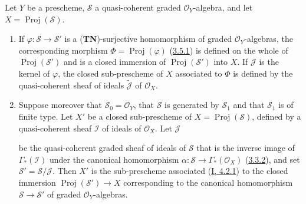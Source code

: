 \begin{proposition}[3.6.2]
\label{II.3.6.2}
Let $Y$ be a prescheme, $\mathcal{S}$ a quasi-coherent graded
$\mathcal{O}_Y$-algebra, and let $X=\operatorname{Proj}(\mathcal{S})$.
\begin{enumerate}
  \item[\rm(i)] If $\varphi:\mathcal{S}\to\mathcal{S}'$ is a
    (\textbf{TN})-surjective homomorphism of graded $\mathcal{O}_Y$-algebras,
    the corresponding morphism
    $\Phi=\operatorname{Proj}(\varphi)$
    (\hyperref[II.3.5.1]{3.5.1}) is defined on the whole of
    $\operatorname{Proj}(\mathcal{S}')$ and is a closed
    immersion of $\operatorname{Proj}(\mathcal{S}')$ into $X$. If $\mathcal{J}$
    is the kernel of $\varphi$, the closed sub-prescheme of $X$ associated to
    $\Phi$ is defined by the quasi-coherent sheaf of ideals
    $\widetilde{\mathcal{J}}$ of $\mathcal{O}_X$.
  \item[\rm(ii)] Suppose moreover that $\mathcal{S}_0=\mathcal{O}_Y$,
    that $\mathcal{S}$ is generated by $\mathcal{S}_1$ and that $\mathcal{S}_1$
    is of finite type. Let $X'$ be a closed sub-prescheme of
    $X=\operatorname{Proj}(\mathcal{S})$, defined by a quasi-coherent sheaf
    $\mathcal{I}$ of ideals of $\mathcal{O}_X$. Let
    $\mathcal{J}$


    be the quasi-coherent graded sheaf of ideals of $\mathcal{S}$ that is the
    inverse image of $\Gamma_*(\mathcal{I})$ under the canonical homomorphism
    $\alpha:\mathcal{S}\to\Gamma_*(\mathcal{O}_X)$
    (\hyperref[II.3.3.2]{3.3.2}), and set
    $\mathcal{S}'=\mathcal{S}/\mathcal{J}$. Then $X'$ is the sub-prescheme
    associated (\hyperref[I.4.2.1]{I, 4.2.1}) to the closed immersion
    $\operatorname{Proj}(\mathcal{S}')\to X$ corresponding to the canonical
    homomorphism $\mathcal{S}\to\mathcal{S}'$ of graded
    $\mathcal{O}_Y$-algebras.
\end{enumerate}
\end{proposition}

